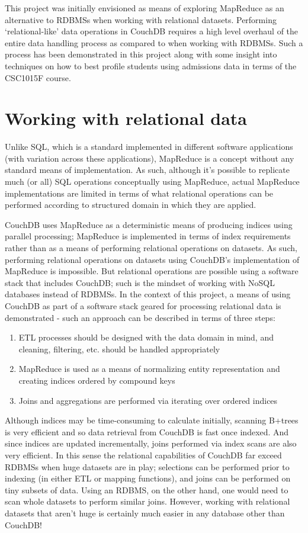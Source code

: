 This project was initially envisioned as means of exploring MapReduce as an alternative to RDBMSs when working with relational datasets. Performing `relational-like' data operations in CouchDB requires a high level overhaul of the entire data handling process as compared to when working with RDBMSs. Such a process has been demonstrated in this project along with some insight into techniques on how to best profile students using admissions data in terms of the CSC1015F course.

\section{Working with relational data}
Unlike SQL, which is a standard implemented in different software applications (with variation across these applications), MapReduce is a concept without any standard means of implementation. As such, although it's possible to replicate much (or all) SQL operations conceptually using MapReduce, actual MapReduce implementations are limited in terms of what relational operations can be performed according to structured domain in which they are applied.

CouchDB uses MapReduce as a deterministic means of producing indices using parallel processing; MapReduce is implemented in terms of index requirements rather than as a means of performing relational operations on datasets. As such, performing relational operations on datasets using CouchDB's implementation of MapReduce is impossible. But relational operations are possible using a software stack that includes CouchDB; such is the mindset of working with NoSQL databases instead of RDBMSs. In the context of this project, a means of using CouchDB as part of a software stack geared for processing relational data is demonstrated - such an approach can be described in terms of three steps:

\begin{enumerate}
    \item ETL processes should be designed with the data domain in mind, and cleaning, filtering, etc. should be handled appropriately
    \item MapReduce is used as a means of normalizing entity representation and creating indices ordered by compound keys
    \item Joins and aggregations are performed via iterating over ordered indices
\end{enumerate}

Although indices may be time-consuming to calculate initially, scanning B+trees is very efficient and so data retrieval from CouchDB is fast once indexed. And since indices are updated incrementally, joins performed via index scans are also very efficient. In this sense the relational capabilities of CouchDB far exceed RDBMSs when huge datasets are in play; selections can be performed prior to indexing (in either ETL or mapping functions), and joins can be performed on tiny subsets of data. Using an RDBMS, on the other hand, one would need to scan whole datasets to perform similar joins. However, working with relational datasets that aren't huge is certainly much easier in any database other than CouchDB!